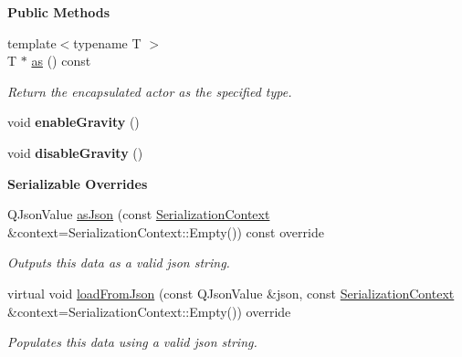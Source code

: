 \begin{Indent}\textbf{ Public Methods}\par
\begin{DoxyCompactItemize}
\item 
\mbox{\label{classrev_1_1_physics_actor_af5746fa465f9c7358f8058a7d245163a}} 
{\footnotesize template$<$typename T $>$ }\\T $\ast$ \mbox{\hyperlink{classrev_1_1_physics_actor_af5746fa465f9c7358f8058a7d245163a}{as}} () const
\begin{DoxyCompactList}\small\item\em Return the encapsulated actor as the specified type. \end{DoxyCompactList}\item 
\mbox{\label{classrev_1_1_physics_actor_a1d766330eff6282cf53b8528debd0f85}} 
void {\bfseries enable\+Gravity} ()
\item 
\mbox{\label{classrev_1_1_physics_actor_a84b462f755534c6854e2098210a0b956}} 
void {\bfseries disable\+Gravity} ()
\end{DoxyCompactItemize}
\end{Indent}
\begin{Indent}\textbf{ Serializable Overrides}\par
\begin{DoxyCompactItemize}
\item 
\mbox{\label{classrev_1_1_physics_actor_a4c77ecf8b21ee91d2af3a51080f4bdae}} 
Q\+Json\+Value \mbox{\hyperlink{classrev_1_1_physics_actor_a4c77ecf8b21ee91d2af3a51080f4bdae}{as\+Json}} (const \mbox{\hyperlink{structrev_1_1_serialization_context}{Serialization\+Context}} \&context=Serialization\+Context\+::\+Empty()) const override
\begin{DoxyCompactList}\small\item\em Outputs this data as a valid json string. \end{DoxyCompactList}\item 
\mbox{\label{classrev_1_1_physics_actor_a5ca2bbb7f0bb951958ab9b4d37daa885}} 
virtual void \mbox{\hyperlink{classrev_1_1_physics_actor_a5ca2bbb7f0bb951958ab9b4d37daa885}{load\+From\+Json}} (const Q\+Json\+Value \&json, const \mbox{\hyperlink{structrev_1_1_serialization_context}{Serialization\+Context}} \&context=Serialization\+Context\+::\+Empty()) override
\begin{DoxyCompactList}\small\item\em Populates this data using a valid json string. \end{DoxyCompactList}\end{DoxyCompactItemize}
\end{Indent}

